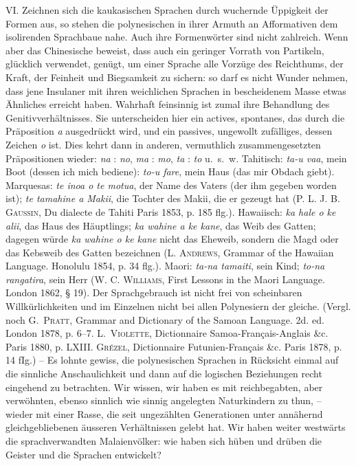 VI. Zeichnen sich die kaukasischen Sprachen durch wuchernde \label{fp.443} Üppigkeit der Formen aus, so stehen die polynesischen in ihrer Armuth an Afformativen dem isolirenden Sprachbaue nahe. Auch ihre Formenwörter sind nicht zahlreich. Wenn aber das Chinesische beweist, dass auch ein geringer Vorrath von Partikeln, glücklich verwendet, genügt, um einer Sprache alle Vorzüge des Reichthums, der Kraft, der Feinheit und Biegsamkeit zu sichern: so darf es nicht Wunder nehmen, dass jene Insulaner mit ihren weichlichen Sprachen in bescheidenem Masse etwas Ähnliches erreicht haben. Wahrhaft feinsinnig ist zumal ihre Behandlung des Genitivverhältnisses. Sie unterscheiden hier ein actives, spontanes, das durch die Präposition \textit{a} ausgedrückt wird, und ein passives, ungewollt zufälliges, dessen Zeichen \textit{o} ist. Dies kehrt dann in anderen, vermuthlich zusammengesetzten Präpositionen wieder: \textit{na }: \textit{no}, \textit{ma }: \textit{mo}, \textit{ta }: \textit{to} u.~s.~w. Tahitisch: \textit{ta-u vaa}, mein Boot (dessen ich mich bediene): \textit{to-u fare}, mein Haus (das mir Obdach giebt). Marquesas: \textit{te inoa o te motua}, der Name des Vaters (der ihm gegeben worden ist); \textit{te tamahine a Makii}, die Tochter des Makii, die er gezeugt hat (\textsc{P. L. J. B. Gaussin}, Du dialecte de Tahiti  Paris 1853, p. 185 flg.). Hawaiisch: \textit{ka hale o ke alii}, das Haus des Häuptlings; \textit{ka wahine a ke kane}, das Weib des Gatten; dagegen würde \textit{ka wahine o ke kane} nicht das Eheweib, sondern die Magd oder das Kebsweib des Gatten bezeichnen (\textsc{L. Andrews}, Grammar of the Hawaiian Language. Honolulu 1854, p. 34 flg.). Maori: \textit{ta-na tamaiti}, sein Kind; \textit{to-na rangatira}, sein Herr (\textsc{W. C. Williams}, First Lessons in the Maori Language. London 1862, § 19). Der Sprachgebrauch ist nicht frei von scheinbaren Willkürlichkeiten und im Einzelnen nicht bei allen Polynesiern der gleiche. (Vergl. noch \textsc{G.~Pratt}, Grammar and Dictionary of the Samoan Language. 2d. ed. London 1878, p. 6–7. \textsc{L.~Violette}, Dictionnaire Samoa-Français-Anglais \&c. Paris 1880, p. LXIII. \textsc{Grézel}, Dictionnaire Futunien-Français \&c. Paris 1878, p. 14 fIg.) – Es lohnte gewiss, die polynesischen Sprachen in Rücksicht einmal auf die sinnliche Anschaulichkeit und dann auf die logischen Beziehungen recht eingehend zu betrachten. Wir wissen, wir haben es mit reichbegabten, aber verwöhnten, ebenso sinnlich wie sinnig angelegten Naturkindern zu thun, – wieder mit einer Rasse, die seit ungezählten Generationen unter annähernd gleichgebliebenen äusseren Verhältnissen gelebt hat. Wir haben weiter westwärts die sprachverwandten Malaienvölker: wie haben sich hüben und drüben die Geister und die Sprachen entwickelt?

